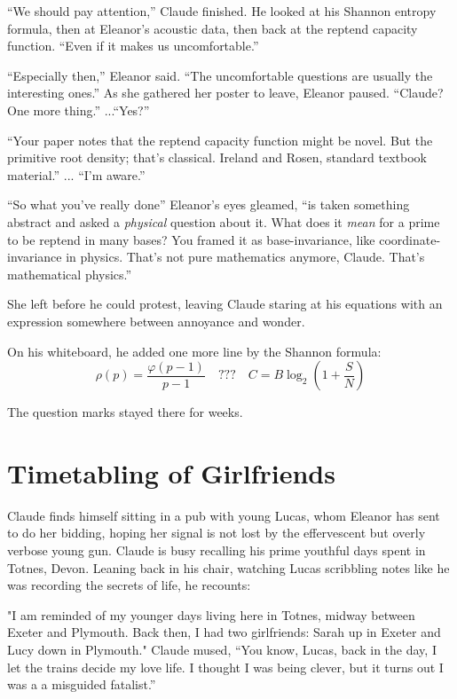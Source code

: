``We should pay attention,'' Claude finished. He looked at his Shannon entropy formula, then at Eleanor's acoustic data, then back at the reptend capacity function. ``Even if it makes us uncomfortable.''

``Especially then,'' Eleanor said. ``The uncomfortable questions are usually the interesting ones.'' As she gathered her poster to leave, Eleanor paused. ``Claude? One more thing.'' ...``Yes?''

``Your paper notes that the reptend capacity function might be novel. But the primitive root density; that's classical. Ireland and Rosen, standard textbook material.'' ... ``I'm aware.''

``So what you've really done'' Eleanor's eyes gleamed, ``is taken something abstract and asked a \emph{physical} question about it. What does it \emph{mean} for a prime to be reptend in many bases? You framed it as base-invariance, like coordinate-invariance in physics. That's not pure mathematics anymore, Claude. That's mathematical physics.''

She left before he could protest, leaving Claude staring at his equations with an expression somewhere between annoyance and wonder.

On his whiteboard, he added one more line by the Shannon formula:
\[
\rho(p) = \frac{\varphi(p-1)}{p-1} \quad \text{???} \quad C = B \log_2\left(1 + \frac{S}{N}\right)
\]

The question marks stayed there for weeks.

\begin{center}
\decofourleft \quad \decofourright
\end{center}

\vspace{1em}


\section*{Timetabling of Girlfriends}

Claude finds himself sitting in a pub with young Lucas, whom Eleanor has sent to do her bidding, hoping her signal is not lost by the effervescent but overly verbose young gun. Claude is busy recalling his prime youthful days spent in Totnes, Devon. Leaning back in his chair, watching Lucas scribbling notes like he was recording the secrets of life, he recounts:

"I am reminded of my younger days living here in Totnes, midway between Exeter and Plymouth. Back then, I had two girlfriends: Sarah up in Exeter and Lucy down in Plymouth." Claude mused, “You know, Lucas, back in the day, I let the trains decide my love life. I thought I was being clever, but it turns out I was a a misguided fatalist.”  

